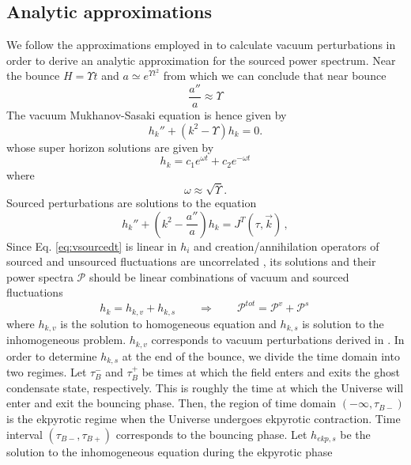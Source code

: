 \documentclass[12pt,a4paper]{article}
\numberwithin{equation}{section}
\numberwithin{equation}{section}
\begin{document}
\subsection{Analytic approximations}
\label{sec:analap}
We follow the approximations employed in \cite{Cai:2012va} to calculate vacuum perturbations in order to derive an analytic approximation for the sourced power spectrum. Near the bounce
$H=\Upsilon t$ and $a \simeq e^{\Upsilon t^2}$ from which we can conclude that near bounce
\begin{equation}
    \frac{a''}{a} \approx \Upsilon
\end{equation}
The vacuum Mukhanov-Sasaki equation is hence given by 
\begin{equation}
    h_k''+(k^2-\Upsilon) h_k = 0. 
\end{equation}
whose super horizon solutions are given by
\begin{equation}
    h_k = c_1 e^{\omega t} + c_2 e^{-\omega t}
\end{equation}
where
\begin{equation}
    \omega \approx \sqrt{\Upsilon}. 
\end{equation}
Sourced perturbations are solutions to the equation
\begin{equation}
h_k'' + \left( k^2-\frac{a''}{a}\right)h_k =  J^T(\tau,\Vec{k} ) \, , \label{eq:vsourcedt}
\end{equation}
 Since Eq. \eqref{eq:vsourcedt} is linear in $h_i$ and creation/annihilation operators of sourced and unsourced fluctuations are uncorrelated \cite{Barnaby:2012xt}, its solutions and their power spectra $\mathcal{P}$ should be linear combinations of vacuum and sourced fluctuations 
\begin{equation}
h_k =  h_{k,v} + h_{k,s}  \qquad \Rightarrow \qquad \mathcal{P}^{tot} = \mathcal{P}^v + \mathcal{P}^s \, 
\end{equation}
where $h_{k,v}$ is the solution to homogeneous equation and  $h_{k,s}$ is solution to the inhomogeneous problem. $h_{k,v}$ corresponds to vacuum perturbations derived in \cite{Cai:2012va}. In order to determine $h_{k,s}$ at the end of the bounce, we divide the time domain into two regimes. Let $\tau_B^{-}$ and $\tau_B^{+}$ be times at which the field enters and exits the ghost condensate state, respectively. This is roughly the time at which the Universe will enter and exit the bouncing phase. Then, the region of time domain $(-\infty,\tau_{B-})$ is the ekpyrotic regime when the Universe undergoes ekpyrotic contraction. Time interval  $(\tau_{B-},\tau_{B+})$ corresponds to the bouncing phase. Let $h_{ekp,s}$ be the solution to the inhomogeneous equation during the ekpyrotic phase
\end{document}
